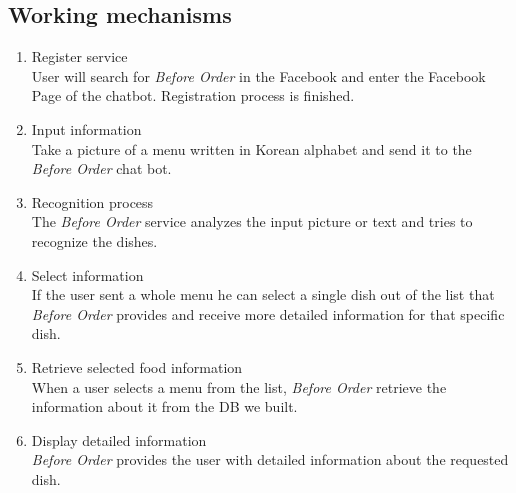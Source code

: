 \subsection{Working mechanisms}
\begin{enumerate}
\item Register service\\
User will search for \emph{Before Order} in the Facebook and enter the Facebook Page of the chatbot. Registration process is finished. \newline
\item Input information\\
Take a picture of a menu written in Korean alphabet and send it to the \emph{Before Order} chat bot. \newline
\item Recognition process\\
The \emph{Before Order} service analyzes the input picture or text and tries to recognize the dishes. \newline
\item Select information\\
If the user sent a whole menu he can select a single dish out of the list that \emph{Before Order} provides and receive more detailed information for that specific dish. \newline
\item Retrieve selected food information\\When a user selects a menu from the list, \emph{Before Order} retrieve the information about it from the DB we built.  \newline
\item Display detailed information\\\emph{Before Order} provides the user with detailed information
about the requested dish.\newline\newline

\end{enumerate}